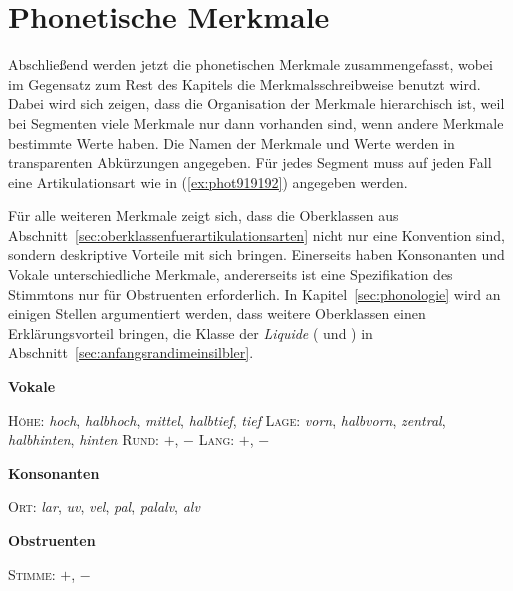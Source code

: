 

\section{Phonetische Merkmale}

\label{sec:phonetischemerkmale}

Abschließend werden jetzt die phonetischen Merkmale zusammengefasst, wobei im Gegensatz zum Rest des Kapitels die Merkmalsschreibweise benutzt wird.
Dabei wird sich zeigen, dass die Organisation der Merkmale hierarchisch ist, weil bei Segmenten viele Merkmale nur dann vorhanden sind, wenn andere Merkmale bestimmte Werte haben.
Die Namen der Merkmale und Werte werden in transparenten Abkürzungen angegeben.
Für jedes Segment muss auf jeden Fall eine Artikulationsart wie in (\ref{ex:phot919192}) angegeben werden.

\begin{exe}
\end{exe}

Für alle weiteren Merkmale zeigt sich, dass die Oberklassen aus Abschnitt~\ref{sec:oberklassenfuerartikulationsarten} nicht nur eine Konvention sind, sondern deskriptive Vorteile mit sich bringen.
Einerseits haben Konsonanten und Vokale unterschiedliche Merkmale, andererseits ist eine Spezifikation des Stimmtons nur für Obstruenten erforderlich.
In Kapitel~\ref{sec:phonologie} wird an einigen Stellen argumentiert werden, dass weitere Oberklassen einen Erklärungsvorteil bringen, \zB die Klasse der \textit{Liquide} (\textipa{[K]} und \textipa{[l]}) in Abschnitt~\ref{sec:anfangsrandimeinsilbler}.

\begin{exe}
	\ex \textbf{Vokale}
		\begin{xlist}
			\ex \textsc{Höhe}: \textit{hoch}, \textit{halbhoch}, \textit{mittel}, \textit{halbtief}, \textit{tief}
			\ex \textsc{Lage}: \textit{vorn}, \textit{halbvorn}, \textit{zentral}, \textit{halbhinten}, \textit{hinten}
			\ex \textsc{Rund}: $+$, $-$
			\ex \textsc{Lang}: $+$, $-$
		\end{xlist}
	\ex \textbf{Konsonanten}
		\begin{xlist}
			\ex \textsc{Ort}: \textit{lar}, \textit{uv}, \textit{vel}, \textit{pal}, \textit{palalv}, \textit{alv}
		\end{xlist}
	\ex \textbf{Obstruenten}
		\begin{xlist}
			\ex \textsc{Stimme}: $+$, $-$
		\end{xlist}
\end{exe}

